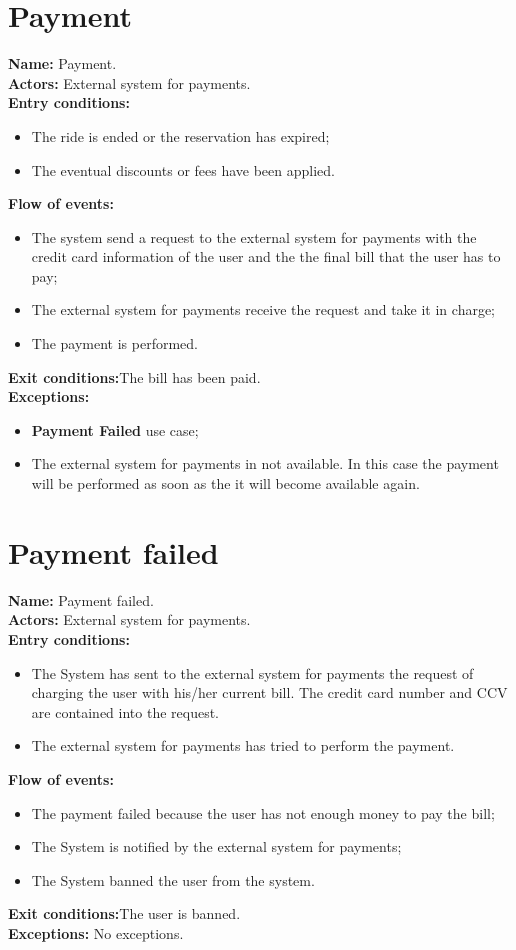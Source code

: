 \section*{Payment}
\textbf{Name:} Payment.\\
\textbf{Actors:} External system for payments.\\
\textbf{Entry conditions:}
\begin{itemize}
\item The ride is ended or the reservation has expired;
\item The eventual discounts or fees have been applied.
\end{itemize}
\textbf{Flow of events:}
\begin{itemize}
\item The system send a request to the external system for payments with the credit card information of the user and the the final bill that the user has to pay;
\item The external system for payments receive the request and take it in charge;
\item The payment is performed.
\end{itemize}
\textbf{Exit conditions:}The bill has been paid.\\
\textbf{Exceptions:}
\begin{itemize}
\item\textbf{Payment Failed} use case;
\item The external system for payments in not available. In this case the payment will be performed as soon as the it will become available again.
\end{itemize}

\section*{Payment failed}
\textbf{Name:} Payment failed.\\
\textbf{Actors:} External system for payments.\\
\textbf{Entry conditions:}
\begin{itemize}
\item The System has sent to the external system for payments the request of charging the user with his/her current bill. The credit card number and CCV are contained into the request.
\item The external system for payments has tried to perform the payment.
\end{itemize}
\textbf{Flow of events:}
\begin{itemize}
\item The payment failed because the user has not enough money to pay the bill;
\item The System is notified by the external system for payments;
\item The System banned the user from the system.
\end{itemize}
\textbf{Exit conditions:}The user is banned.\\
\textbf{Exceptions:} No exceptions.

